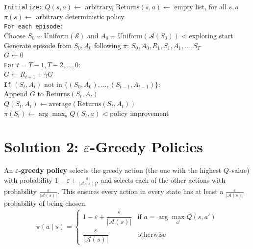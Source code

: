 \documentclass[journal, onecolumn]{IEEEtran}
\newcommand{\vocab}[1]{\textbf{\textcolor{Garnet}{#1}}}
\begin{document}
\begin{tcolorbox}[examplebox={MC with Exploring Starts (MC ES) Pseudocode}]
\texttt{Initialize:} $Q(s,a) \leftarrow$ arbitrary, $\text{Returns}(s,a) \leftarrow$ empty list, for all $s, a$\\
\quad\quad\quad\; $\pi(s) \leftarrow$ arbitrary deterministic policy\\[4pt]
\texttt{For each episode:}\\
\quad Choose $S_0 \sim \text{Uniform}(\mathcal{S})$ and $A_0 \sim \text{Uniform}(\mathcal{A}(S_0))$ \hfill \textcolor{Garnet}{$\triangleleft$ exploring start}\\
\quad Generate episode from $S_0, A_0$ following $\pi$: $S_0, A_0, R_1, S_1, A_1, \ldots, S_T$\\
\quad $G \leftarrow 0$\\
\quad \texttt{For} $t = T-1, T-2, \ldots, 0$:\\
\quad\quad $G \leftarrow R_{t+1} + \gamma G$\\
\quad\quad \texttt{If} $(S_t, A_t)$ not in $\{(S_0,A_0), \ldots, (S_{t-1},A_{t-1})\}$:\\
\quad\quad\quad Append $G$ to $\text{Returns}(S_t, A_t)$\\
\quad\quad\quad $Q(S_t, A_t) \leftarrow \text{average}(\text{Returns}(S_t, A_t))$\\
\quad\quad\quad $\pi(S_t) \leftarrow \arg\max_a Q(S_t, a)$ \hfill \textcolor{Garnet}{$\triangleleft$ policy improvement}
\end{tcolorbox}

\section{Solution 2: $\varepsilon$-Greedy Policies}

\begin{tcolorbox}[memorybox={Definition: $\varepsilon$-Greedy Policy}]
An \vocab{$\varepsilon$-greedy policy} selects the greedy action (the one with the highest $Q$-value) with probability $1 - \varepsilon + \frac{\varepsilon}{|\mathcal{A}(s)|}$, and selects each of the other actions with probability $\frac{\varepsilon}{|\mathcal{A}(s)|}$. This ensures every action in every state has at least a $\frac{\varepsilon}{|\mathcal{A}(s)|}$ probability of being chosen.
\begin{align}
    \pi(a \mid s) = \begin{cases}
        1 - \varepsilon + \dfrac{\varepsilon}{|\mathcal{A}(s)|} & \text{if } a = \arg\max_{a'} Q(s, a') \\[8pt]
        \dfrac{\varepsilon}{|\mathcal{A}(s)|} & \text{otherwise}
    \end{cases}
\end{align}
\end{tcolorbox}
\end{document}
